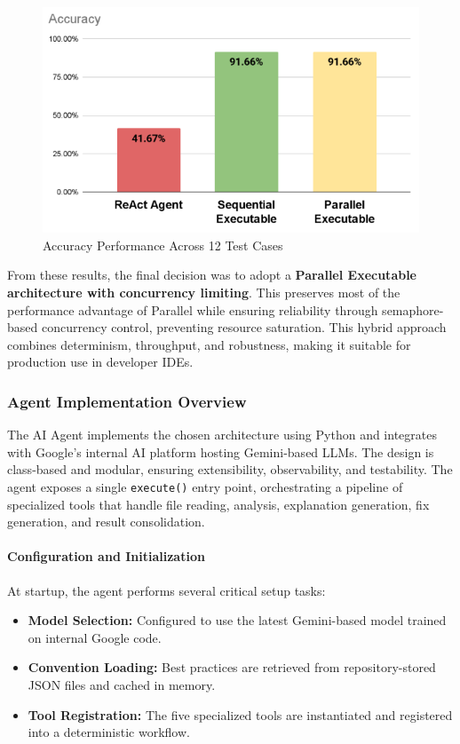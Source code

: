 \begin{spacing}{1.2}
\begin{figure}[H]
\centering
\includegraphics[scale=0.5]{images/accuracy.png}
\caption{Accuracy Performance Across 12 Test Cases}
\label{fig:accuracy_comparison_ch4}
\end{figure}

From these results, the final decision was to adopt a \textbf{Parallel Executable architecture with concurrency limiting}. 
This preserves most of the performance advantage of Parallel while ensuring reliability through semaphore-based 
concurrency control, preventing resource saturation. This hybrid approach combines determinism, throughput, and robustness, 
making it suitable for production use in developer IDEs.

\subsubsection{Agent Implementation Overview}
The AI Agent implements the chosen architecture using Python and integrates with Google’s internal AI platform 
hosting Gemini-based LLMs. The design is class-based and modular, ensuring extensibility, observability, and testability.  
The agent exposes a single \texttt{execute()} entry point, orchestrating a pipeline of specialized tools that handle 
file reading, analysis, explanation generation, fix generation, and result consolidation.

\paragraph{Configuration and Initialization}
At startup, the agent performs several critical setup tasks:
\begin{itemize}
    \item \textbf{Model Selection:} Configured to use the latest Gemini-based model trained on internal Google code.
    \item \textbf{Convention Loading:} Best practices are retrieved from repository-stored JSON files and cached in memory.
    \item \textbf{Tool Registration:} The five specialized tools are instantiated and registered into a deterministic workflow.
\end{itemize}


\end{spacing}
